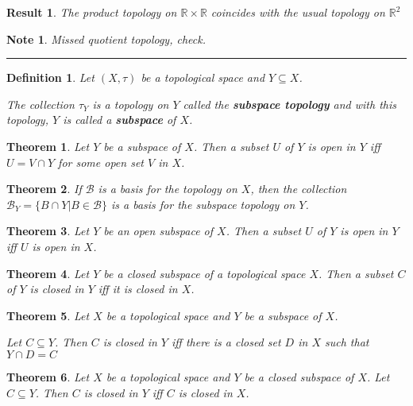 \documentclass[14pt,twoside]{extreport}
\newcommand{\hhrule}{\vspace{1cm}\hrule\vspace{1cm}}
\theoremstyle{dotless}
\newtheorem*{defn}{Definition}
\newtheorem*{thm}{Theorem} %
\newtheorem*{note}{Note} %
\newtheorem*{result}{Result} %
\begin{document}
\begin{result}
    The product topology on $\mathbb{R} \times \mathbb{R}$ coincides with the usual topology on $\mathbb{R}^2$
\end{result}

\begin{note}
    Missed quotient topology, check.
\end{note}
\hhrule

\begin{defn}
    Let $(X, \tau)$ be a topological space and $Y \subseteq X$.
    
    The collection $\tau_Y$ is a topology on $Y$ called the \textbf{subspace topology} and with this topology, $Y$ is called a \textbf{subspace} of $X$.
\end{defn}

\begin{thm}
    Let $Y$ be a subspace of $X$. Then a subset $U$ of $Y$ is open in $Y$ iff $U = V \cap Y$ for some open set $V$ in $X$.
\end{thm}

\begin{thm}
    If $\mathscr{B}$ is a basis for the topology on $X$, then the collection $\mathscr{B}_Y = \{ B \cap Y  | B \in \mathscr{B} \}$ is a basis for the subspace topology on $Y$.
\end{thm}



\begin{thm}
    Let $Y$ be an open subspace of $X$. Then a subset $U$ of $Y$ is open in $Y$ iff $U$ is open in $X$.
\end{thm}

\begin{thm}
    Let $Y$ be a closed subspace of a topological space $X$. Then a subset $C$ of $Y$ is closed in $Y$ iff it is closed in $X$.
\end{thm}

\begin{thm}
    Let $X$ be a topological space and $Y$ be a subspace of $X$.

    Let $C \subseteq Y$. Then $C$ is closed in $Y$ iff there is a closed set $D$ in $X$ such that $Y \cap D = C$
\end{thm}

\begin{thm}
    Let $X$ be a topological space and $Y$ be a closed subspace of $X$. Let $C \subseteq Y$. Then $C$ is closed in $Y$ iff $C$ is closed in $X$.
\end{thm}
\end{document}
